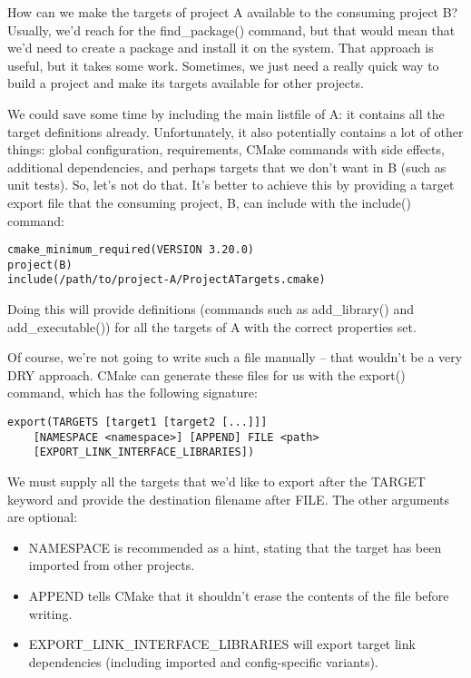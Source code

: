 How can we make the targets of project A available to the consuming project B? Usually, we'd reach for the find\_package() command, but that would mean that we'd need to create a package and install it on the system. That approach is useful, but it takes some work. Sometimes, we just need a really quick way to build a project and make its targets available for other projects.

We could save some time by including the main listfile of A: it contains all the target definitions already. Unfortunately, it also potentially contains a lot of other things: global configuration, requirements, CMake commands with side effects, additional dependencies, and perhaps targets that we don't want in B (such as unit tests). So, let's not do that. It's better to achieve this by providing a target export file that the consuming project, B, can include with the include() command:

\begin{lstlisting}[style=styleCMake]
cmake_minimum_required(VERSION 3.20.0)
project(B)
include(/path/to/project-A/ProjectATargets.cmake)
\end{lstlisting}

Doing this will provide definitions (commands such as add\_library() and add\_executable()) for all the targets of A with the correct properties set.

Of course, we're not going to write such a file manually – that wouldn't be a very DRY approach. CMake can generate these files for us with the export() command, which has the following signature:

\begin{lstlisting}[style=styleCMake]
export(TARGETS [target1 [target2 [...]]]
	[NAMESPACE <namespace>] [APPEND] FILE <path>
	[EXPORT_LINK_INTERFACE_LIBRARIES])
\end{lstlisting}

We must supply all the targets that we'd like to export after the TARGET keyword and provide the destination filename after FILE. The other arguments are optional:

\begin{itemize}
\item 
NAMESPACE is recommended as a hint, stating that the target has been imported from other projects.

\item 
APPEND tells CMake that it shouldn't erase the contents of the file before writing.

\item 
EXPORT\_LINK\_INTERFACE\_LIBRARIES will export target link dependencies (including imported and config-specific variants).
\end{itemize}

